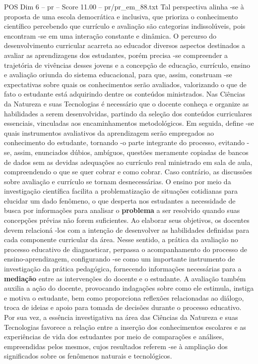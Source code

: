 \begin{textsample}{POS Dim 6 – pr – Score 11.00 – pr/pr\_em\_88.txt}
Tal perspectiva alinha -se à proposta de uma escola democrática e inclusiva, que prioriza o conhecimento científico percebendo que currículo e avaliação são categorias indissolúveis, pois encontram -se em uma interação constante e dinâmica.
O percurso do desenvolvimento curricular acarreta ao educador diversos aspectos destinados a avaliar as aprendizagens dos estudantes, porém precisa -se compreender a trajetória de vivências desses jovens e a concepção de educação, currículo, ensino e avaliação oriunda do sistema educacional, para que, assim, construam -se expectativas sobre quais os conhecimentos serão avaliados, valorizando o que de fato o estudante está adquirindo dentre os conteúdos ministrados.
Nas Ciências da Natureza e suas Tecnologias é necessário que o docente conheça e organize as habilidades a serem desenvolvidas, partindo da seleção dos conteúdos curriculares essenciais, vinculadas aos encaminhamentos metodológicos.
Em seguida, define -se quais instrumentos avaliativos da aprendizagem serão empregados ao conhecimento do estudante, tornando -o parte integrante do processo, evitando -se, assim, enunciados dúbios, ambíguos, questões meramente copiadas de bancos de dados sem as devidas adequações ao currículo real ministrado em sala de aula, compreendendo o que se quer cobrar e como cobrar.
Caso contrário, as discussões sobre avaliação e currículo se tornam desnecessárias.
O ensino por meio da investigação científica facilita a problematização de situações cotidianas para elucidar um dado fenômeno, o que desperta nos estudantes a necessidade de busca por informações para analisar o \textbf{problema} a ser resolvido quando suas concepções prévias não forem suficientes.
Ao elaborar seus objetivos, os docentes devem relacioná -los com a intenção de desenvolver as habilidades definidas para cada componente curricular da área.
Nesse sentido, a prática da avaliação no processo educativo de diagnosticar, perpassa o acompanhamento do processo de ensino-aprendizagem, configurando -se como um importante instrumento de investigação da prática pedagógica, fornecendo informações necessárias para a \textbf{mediação} entre as intervenções do docente e o estudante.
A avaliação também auxilia a ação do docente, provocando indagações sobre como ele estimula, instiga e motiva o estudante, bem como proporciona reflexões relacionadas ao diálogo, troca de ideias e apoio para tomada de decisões durante o processo educativo.
Por sua vez, a essência investigativa na área das Ciências da Natureza e suas Tecnologias favorece a relação entre a inserção dos conhecimentos escolares e as experiências de vida dos estudantes por meio de comparações e análises, empreendidas pelos mesmos, cujos resultados referem -se à ampliação dos significados sobre os fenômenos naturais e tecnológicos.

\end{textsample}
